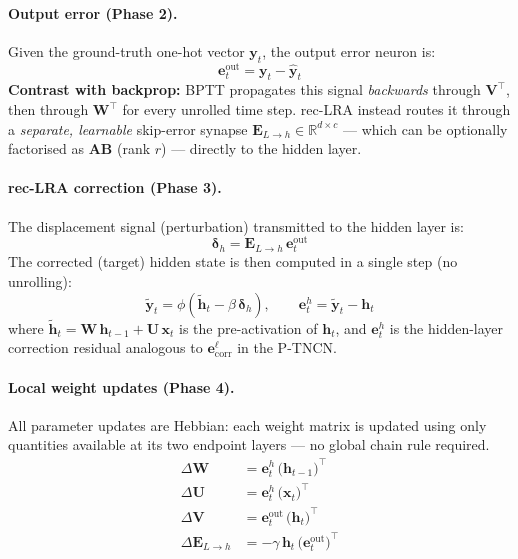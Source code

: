 \documentclass[11pt]{article}
\theoremstyle{definition}
\newcommand{\ve}{\mathbf{e}}
\begin{document}
\paragraph{Output error (Phase 2).}
Given the ground-truth one-hot vector $\mathbf{y}_t$, the output error neuron is:
\begin{equation}
  \mathbf{e}^{\mathrm{out}}_t = \mathbf{y}_t - \hat{\mathbf{y}}_t
  \label{eq:rnn_eout}
\end{equation}
\textbf{Contrast with backprop:} BPTT propagates this signal \emph{backwards} through
$\mathbf{V}^\top$, then through $\mathbf{W}^\top$ for every unrolled time step.
rec-LRA instead routes it through a \emph{separate, learnable} skip-error synapse
$\mathbf{E}_{L \to h} \in \mathbb{R}^{d \times c}$ — which can be optionally
factorised as $\mathbf{A}\mathbf{B}$ (rank $r$) — directly to the hidden layer.

\paragraph{rec-LRA correction (Phase 3).}
The displacement signal (perturbation) transmitted to the hidden layer is:
\begin{equation}
  \bm{\delta}_h = \mathbf{E}_{L \to h}\,\mathbf{e}^{\mathrm{out}}_t
  \label{eq:rnn_delta}
\end{equation}
The corrected (target) hidden state is then computed in a single step (no unrolling):
\begin{equation}
  \tilde{\mathbf{y}}_t = \phi\!\left(\tilde{\mathbf{h}}_t - \beta\,\bm{\delta}_h\right),
  \qquad \mathbf{e}^h_t = \tilde{\mathbf{y}}_t - \mathbf{h}_t
  \label{eq:rnn_corrected}
\end{equation}
where $\tilde{\mathbf{h}}_t = \mathbf{W}\,\mathbf{h}_{t-1} + \mathbf{U}\,\mathbf{x}_t$
is the pre-activation of $\mathbf{h}_t$, and $\mathbf{e}^h_t$ is the hidden-layer
correction residual analogous to $\ve^\ell_\mathrm{corr}$ in the P-TNCN.

\paragraph{Local weight updates (Phase 4).}
All parameter updates are Hebbian: each weight matrix is updated using only
quantities available at its two endpoint layers — no global chain rule required.
\begin{align}
  \Delta\mathbf{W}              &= \mathbf{e}^h_t\,\bigl(\mathbf{h}_{t-1}\bigr)^\top
                                   \label{eq:rnn_dW} \\
  \Delta\mathbf{U}              &= \mathbf{e}^h_t\,\bigl(\mathbf{x}_t\bigr)^\top
                                   \label{eq:rnn_dU} \\
  \Delta\mathbf{V}              &= \mathbf{e}^{\mathrm{out}}_t\,\bigl(\mathbf{h}_t\bigr)^\top
                                   \label{eq:rnn_dV} \\
  \Delta\mathbf{E}_{L \to h}    &= -\gamma\,\mathbf{h}_t\,\bigl(\mathbf{e}^{\mathrm{out}}_t\bigr)^\top
                                   \label{eq:rnn_dE}
\end{align}
\end{document}
